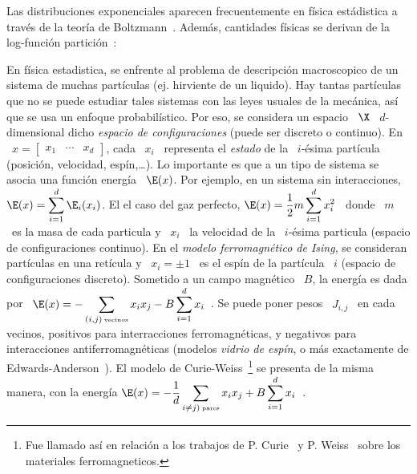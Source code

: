 Las   distribuciones   exponenciales   aparecen   frecuentemente   en   f\'isica
est\'adistica a trav\'es de  la teor\'ia de Boltzmann~\cite{Bol96, Bol98, Gib02,
  LanLif80, MezMon09, Mer10, Mer18}.   Adem\'as, cantidades f\'isicas se derivan
de la  log-funci\'on partici\'on~\cite{Max67, Gib02,  LanLif80, MezMon09, Mer10,
  Mer18}:
%
\begin{ejemplo}
  En f\'isica estadistica, se enfrente al problema de descripci\'on macroscopico
  de un sistema de muchas part\'iculas (ej. hirviente de un liquido). Hay tantas
  part\'iculas que no se puede estudiar  tales sistemas con las leyes usuales de
  la  mec\'anica, as\'i que  se usa  un enfoque  probabil\'istico.  Por  eso, se
  considera  un  espacio  \  $\X$   \  $d$-dimensional  dicho  {\em  espacio  de
    configuraciones} (puede ser discreto o  continuo). En \ $x = \begin{bmatrix}
    x_1 & \cdots & x_d\end{bmatrix}$, cada  \ $x_i$ \ representa el {\em estado}
  de la  \ $i$-\'esima part\'icula (posici\'on,  velocidad, esp\'in,\ldots).  Lo
  importante es  que a un  tipo de sistema  se asocia una funci\'on  energ\'ia \
  $\E(x)$. Por ejemplo, en un  sistema sin interacciones, $\displaystyle \E(x) =
  \sum_{i=1}^d \E_i(x_i)$.  El el caso  del gaz perfecto, $\displaystyle \E(x) =
  \frac12 m \sum_{i=1}^d x_i^2$ \ donde \ $m$ \ es la masa de cada particula y \
  $x_i$ \ la velocidad de la \ $i$-\'esima particula (espacio de configuraciones
  continuo).   En  el {\em  modelo  ferromagn\'etico  de  Ising}, se  consideran
  part\'iculas  en una  ret\'icula y  \ $x_i  = \pm  1$ \  es el  esp\'in  de la
  part\'icula \ $i$ (espacio de  configuraciones discreto).  Sometido a un campo
  magn\'etico  \ $B$,  la  energ\'ia es  dada  por \  $\displaystyle  \E(x) =  -
  \sum_{(i,j)   \:   \mbox{\tiny   vecinos}}    x_i   x_j   -   B   \sum_{i=1}^d
  x_i$~\cite{Len20, Isi25,  Ons44, LanLif80, MezMon09, Mer10,  Mer18}.  Se puede
  poner  pesos \  $J_{i,j}$ \  en  cada vecinos,  positivos para  interracciones
  ferromagn\'eticas,   y  negativos  para   interacciones  antiferromagn\'eticas
  (modelos    {\em    vidrio   de    esp\'in},    o    m\'as   exactamente    de
  Edwards-Anderson~\cite{EdwAnd75,  LanLif80,   MezMon09,  Mer10,  Mer18}).   El
  modelo de Curie-Weiss~\footnote{Fue llamado as\'i en relaci\'on a los trabajos
    de  P.   Curie~\cite{Cur95}  y   P.   Weiss~\cite{Wei96,  Wei07}  sobre  los
    materiales  ferromagneticos.}   se  presenta  de  la misma  manera,  con  la
  energ\'ia $\displaystyle  \E(x) = -  \frac{1}{d} \sum_{i\ne j)  \: \mbox{\tiny
      pares}} x_i x_j + B \sum_{i=1}^d x_i$~\cite{MezMon09, Mer10, Mer18}.


\end{ejemplo}
